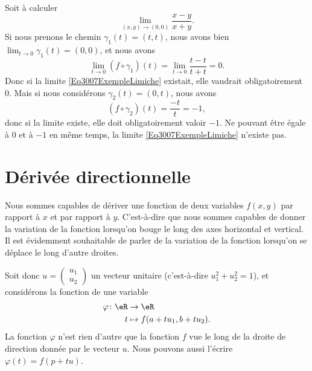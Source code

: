 \begin{example}
	Soit à calculer
	\begin{equation}	\label{Eq3007ExempleLimiche}
		\lim_{(x,y)\to(0,0)}\frac{ x-y }{ x+y }.
	\end{equation}
	Si nous prenons le chemin $\gamma_1(t)=(t,t)$, nous avons bien $\lim_{t\to 0} \gamma_1(t)=(0,0)$, et nous avons
	\begin{equation}
		\lim_{t\to 0} (f\circ\gamma_1)(t)=\lim_{t\to 0} \frac{ t-t }{ t+t }=0.
	\end{equation}
	Donc si la limite \eqref{Eq3007ExempleLimiche} existait, elle vaudrait obligatoirement $0$. Mais si nous considérons $\gamma_2(t)=(0,t)$, nous avons
	\begin{equation}
		(f\circ\gamma_2)(t)=\frac{ -t }{ t }=-1,
	\end{equation}
	donc si la limite existe, elle doit obligatoirement valoir $-1$. Ne pouvant être égale à $0$ et à $-1$ en même temps, la limite \eqref{Eq3007ExempleLimiche} n'existe pas.
\end{example}

\section{Dérivée directionnelle}

Nous sommes capables de dériver une fonction de deux variables $f(x,y)$ par rapport à $x$ et par rapport à $y$. C'est-à-dire que nous sommes capables de donner la variation de la fonction lorsqu'on bouge le long des axes horizontal et vertical. Il est évidemment souhaitable de parler de la variation de la fonction lorsqu'on se déplace le long d'autre droites.

Soit donc $u=\begin{pmatrix}
    u_1    \\
    u_2
\end{pmatrix}$ un vecteur unitaire (c'est-à-dire $u_1^2+u_2^2=1$), et considérons la fonction de une variable
\begin{equation}
    \begin{aligned}
        \varphi\colon \eR&\to \eR \\
        t&\mapsto f(a+tu_1,b+tu_2).
    \end{aligned}
\end{equation}
La fonction $\varphi$ n'est rien d'autre que la fonction $f$ vue le long de la droite de direction donnée par le vecteur $u$. Nous pouvons aussi l'écrire $\varphi(t)=f(p+tu)$.

